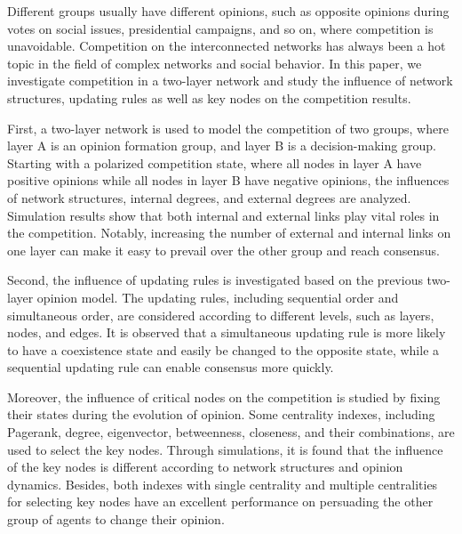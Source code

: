 \begin{englishabstract}
	
Different groups usually have different opinions, such as opposite opinions during votes on social issues, presidential campaigns, and so on, where competition is unavoidable. Competition on the interconnected networks has always been a hot topic in the field of complex networks and social behavior.  In this paper, we investigate competition in a two-layer network and study the influence of network structures, updating rules as well as key nodes on the competition results.

First, a two-layer network is used to model the competition of two groups, where layer A is an opinion formation group, and layer B is a decision-making group. Starting with a polarized competition state, where all nodes in layer A have positive opinions while all nodes in layer B have negative opinions, the influences of network structures, internal degrees, and external degrees are analyzed.  Simulation results show that both internal and external links play vital roles in the competition. Notably, increasing the number of external and internal links on one layer can make it easy to prevail over the other group and reach consensus.

Second, the influence of updating rules is investigated based on the previous two-layer opinion model. The updating rules, including sequential order and simultaneous order, are considered according to different levels, such as layers, nodes, and edges. It is observed that a simultaneous updating rule is more likely to have a coexistence state and easily be changed to the opposite state, while a sequential updating rule can enable consensus more quickly.

Moreover, the influence of critical nodes on the competition is studied by fixing their states during the evolution of opinion. Some centrality indexes, including Pagerank, degree, eigenvector, betweenness, closeness, and their combinations, are used to select the key nodes. Through simulations, it is found that the influence of the key nodes is different according to network structures and opinion dynamics. Besides, both indexes with single centrality and multiple centralities for selecting key nodes have an excellent performance on persuading the other group of agents to change their opinion.\\ 

\end{englishabstract}

